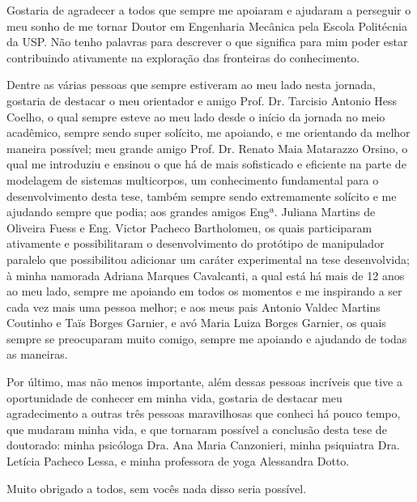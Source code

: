 \documentclass[]{politex}
\begin{document}
\begin{agradecimentos}

Gostaria de agradecer a todos que sempre me apoiaram e ajudaram a perseguir o meu sonho de me tornar Doutor em Engenharia Mecânica pela Escola Politécnia da USP. Não tenho palavras para descrever o que significa para mim poder estar contribuindo ativamente na exploração das fronteiras do conhecimento.

Dentre as várias pessoas que sempre estiveram ao meu lado nesta jornada, gostaria de destacar o meu orientador e amigo Prof. Dr. Tarcisio Antonio Hess Coelho, o qual sempre esteve ao meu lado desde o início da jornada no meio acadêmico, sempre sendo super solícito, me apoiando, e me orientando da melhor maneira possível; meu grande amigo Prof. Dr. Renato Maia Matarazzo Orsino, o qual me introduziu e ensinou o que há de mais sofisticado e eficiente na parte de modelagem de sistemas multicorpos, um conhecimento fundamental para o desenvolvimento desta tese, também sempre sendo extremamente solícito e me ajudando sempre que podia; aos grandes amigos Engª. Juliana Martins de Oliveira Fuess e Eng. Victor Pacheco Bartholomeu, os quais participaram ativamente e possibilitaram o desenvolvimento do protótipo de manipulador paralelo que possibilitou adicionar um caráter experimental na tese desenvolvida; à minha namorada Adriana Marques Cavalcanti, a qual está há mais de 12 anos ao meu lado, sempre me apoiando em todos os momentos e me inspirando a ser cada vez mais uma pessoa melhor; e aos meus pais Antonio Valdec Martins Coutinho e Taïs Borges Garnier, e avó Maria Luiza Borges Garnier, os quais sempre se preocuparam muito comigo, sempre me apoiando e ajudando de todas as maneiras.

Por último, mas não menos importante, além dessas pessoas incríveis que tive a oportunidade de conhecer em minha vida, gostaria de destacar meu agradecimento a outras três pessoas maravilhosas que conheci há pouco tempo, que mudaram minha vida, e que tornaram possível a conclusão desta tese de doutorado: minha psicóloga Dra. Ana Maria Canzonieri, minha psiquiatra Dra. Letícia Pacheco Lessa, e minha professora de yoga Alessandra Dotto.

Muito obrigado a todos, sem vocês nada disso seria possível.

\end{agradecimentos}
\end{document}
